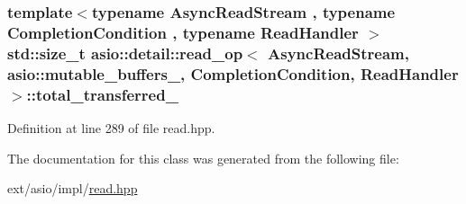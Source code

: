 \subsubsection[{total\+\_\+transferred\+\_\+}]{\setlength{\rightskip}{0pt plus 5cm}template$<$typename Async\+Read\+Stream , typename Completion\+Condition , typename Read\+Handler $>$ std\+::size\+\_\+t {\bf asio\+::detail\+::read\+\_\+op}$<$ Async\+Read\+Stream, {\bf asio\+::mutable\+\_\+buffers\+\_},                           Completion\+Condition, Read\+Handler $>$\+::total\+\_\+transferred\+\_\+}\label{classasio_1_1detail_1_1read__op_3_01_async_read_stream_00_01asio_1_1mutable__buffers__1_00_01_018ff00a3c2aa5481d9cf38a1ea7821a38_a65cce25829008bd8f8c5d0271018c5da}


Definition at line 289 of file read.\+hpp.



The documentation for this class was generated from the following file\+:\begin{DoxyCompactItemize}
\item 
ext/asio/impl/\hyperlink{impl_2read_8hpp}{read.\+hpp}\end{DoxyCompactItemize}
